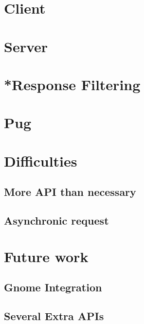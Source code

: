 \documentclass[12pt]{article}
\numberwithin{equation}{section} %
\numberwithin{figure}{section} %
\numberwithin{table}{section} %
\begin{document}
\section{Client}
		
\section{Server}
\section{*Response Filtering}

\section{Pug}

\section{Difficulties}
	
	\subsection{More API than necessary}
	\subsection{Asynchronic request}
\section{Future work}
	\subsection{Gnome Integration}
	\subsection{Several Extra APIs}
\end{document}

